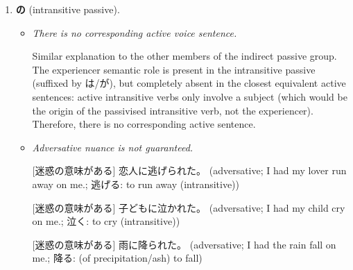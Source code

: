 \documentclass[../nihongo-gakushuu-kyouzai.tex]{subfiles}
\begin{document}
\begin{enumerate}[label=\arabic*.]
\begin{itemize}
        [自動詞の受身、自然] （私は）田中さんにパソコンをされた。 (I got my computer broken on me by Tanaka-san.; す: to break/destroy (transitive))

        [直接受身、自然] 私のパソコンが田中さんにされた。 (My computer was broken by Tanaka-san.)

        \item When the passive sentence involves parties related to the owner, the direct passive is also possible.

        [自動詞の受身、自然] （私は）先生に息子をけなされた。 (I got my child disparaged on me by his teacher.; けなす: to speak ill of/disparage (transitive))

        [直接受身、自然] 私の息子は先生にけなされた。 (My child was disparaged by his teacher.)

    \end{itemize}

    \item \textbf{の} (intransitive passive).


    \begin{itemize}
        \item \emph{There is no corresponding active voice sentence.}

        Similar explanation to the other members of the indirect passive group. The experiencer semantic role is present in the intransitive passive (suffixed by は/が), but completely absent in the closest equivalent active sentences: active intransitive verbs only involve a subject (which would be the origin of the passivised intransitive verb, not the experiencer). Therefore, there is no corresponding active sentence.

        \item \emph{Adversative nuance is not guaranteed.}

        [迷惑の意味がある] 恋人に逃げられた。 (adversative; I had my lover run away on me.; 逃げる: to run away (intransitive))

        [迷惑の意味がある] 子どもに泣かれた。 (adversative; I had my child cry on me.; 泣く: to cry (intransitive))

        [迷惑の意味がある] 雨に降られた。 (adversative; I had the rain fall on me.; 降る: (of precipitation/ash) to fall)


\end{itemize}
\end{enumerate}
\end{document}
